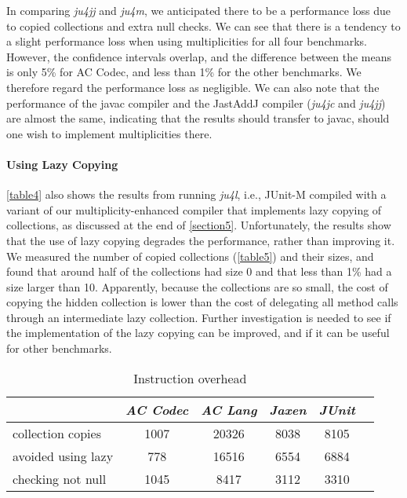 {In comparing \emph{ju4jj} and \emph{ju4m}, we anticipated there
to be a performance loss due to copied collections and extra null checks. We
can see that there is a tendency to a slight performance loss when using
multiplicities for all four benchmarks. However, the confidence intervals
overlap, and the difference between the means is only 5\% for AC Codec, and
less than 1\% for the other benchmarks. We therefore regard the performance
loss as negligible. We can also note that the performance of the javac
compiler and the JastAddJ compiler (\emph{ju4jc} and \emph{ju4jj})
are almost the same, indicating that the results should transfer to javac,
should one wish to implement multiplicities there.

\paragraph{Using Lazy Copying} \autoref{table4} also shows the results from running
\emph{ju4l}, i.e., JUnit-M compiled with a variant of our
multiplicity-enhanced compiler that implements lazy copying of collections,
as discussed at the end of \autoref{section5}. Unfortunately, the results show that
the use of lazy copying degrades the performance, rather than improving it.
We measured the number of copied collections (\autoref{table5}) and their sizes, and
found that around half of the collections had size 0 and that less than 1\%
had a size larger than 10. Apparently, because the collections are so small,
the cost of copying the hidden collection is lower than the cost of delegating all method calls through an intermediate lazy collection.
Further investigation is
needed to see if the implementation of the lazy copying can be improved, and
if it can be useful for other benchmarks.

\begin{table}[h]
  \vspace{1em}
  \centering
\begin{tabular}{l|ccccc}
  \toprule
  & \emph{AC Codec} & \emph{AC Lang} & \emph{Jaxen} & \emph{JUnit} \\
  \hline
  collection copies & 1007 & 20326 & 8038 & 8105 \\
  avoided using lazy & 778 & 16516 & 6554 & 6884 \\
  checking not null & 1045 & 8417 & 3112 & 3310 \\
\end{tabular}
\caption{Instruction overhead}
\label{table5}
\end{table}

}
